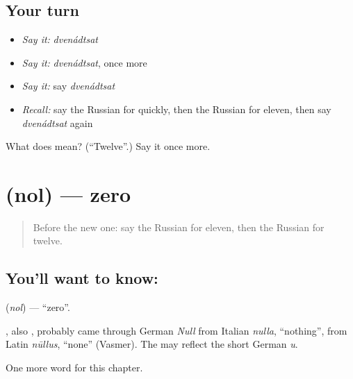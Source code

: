 \subsection*{Your turn}
\begin{itemize}
\raggedright
  \item \emph{Say it:} \emph{dvenádtsat}
  \item \emph{Say it:} \emph{dvenádtsat}, once more
  \item \emph{Say it:} say \emph{dvenádtsat}
  \item \emph{Recall:} say the Russian for quickly, then the Russian for eleven, then say \emph{dvenádtsat} again
\end{itemize}

\begin{tcolorbox}[breakable,colback=teal!4,colframe=teal!35!black,title={Before you move on}]
What does  mean? (\textquotedblleft{}Twelve\textquotedblright{}.) Say it once more.
\end{tcolorbox}
\section[\texorpdfstring{\ru{ноль} (nol)}{ноль (nol)}]{ (nol) — zero}

\label{lesson:RU-C75-zero}



\begin{quote}
Before the new one: say the Russian for eleven, then the Russian for twelve.
\end{quote}

\subsection*{You'll want to know: }
\textbf{} (\emph{nol}) — \textquotedblleft{}zero\textquotedblright{}.

\begin{cousinweb}
\textbf{}, also \emph{}, probably came through German \emph{Null} from Italian \emph{nulla}, \textquotedblleft{}nothing\textquotedblright{}, from Latin \emph{nūllus}, \textquotedblleft{}none\textquotedblright{} (Vasmer). The \emph{} may reflect the short German \emph{u}.
\end{cousinweb}

\begin{grammarlens}[title={What you've built}]
One more word for this chapter.
\end{grammarlens}

